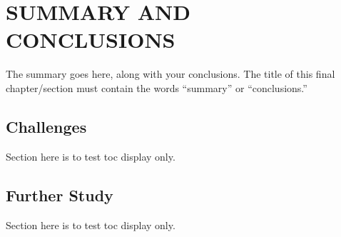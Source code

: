 %
%
%
%



\chapter{SUMMARY AND CONCLUSIONS \label{cha:Summary}}

The summary goes here, along with your conclusions. The title of this final chapter/section must contain the words ``summary'' or ``conclusions.''
\section{Challenges}
Section here is to test toc display only.

\section{Further Study}
Section here is to test toc display only.

